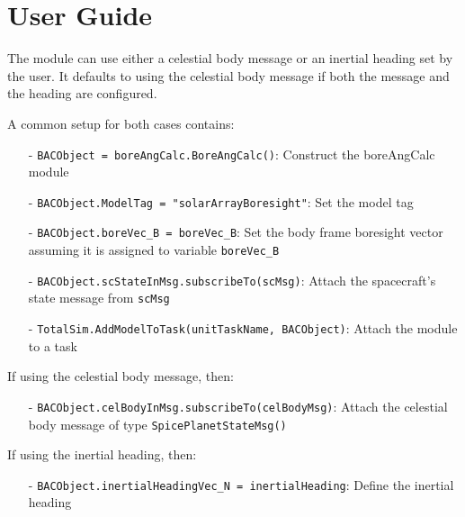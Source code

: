 \section{User Guide}

The module can use either a celestial body message or an inertial heading set by the user. It defaults to using the celestial body message if both the message and the heading are configured.

A common setup for both cases contains:

\begin{itemize}
  \item[-]      \texttt{BACObject = boreAngCalc.BoreAngCalc()}: Construct the boreAngCalc module
  \item[-]   \texttt{BACObject.ModelTag = "solarArrayBoresight"}: Set the model tag
  \item[-]   \texttt{BACObject.boreVec\_B = boreVec\_B}: Set the body frame boresight vector assuming it is assigned to variable \texttt{boreVec\_B}
  \item[-]   \texttt{BACObject.scStateInMsg.subscribeTo(scMsg)}: Attach the spacecraft's state message from \texttt{scMsg}
  \item[-]   \texttt{TotalSim.AddModelToTask(unitTaskName, BACObject)}: Attach the module to a task
\end{itemize}

If using the celestial body message, then:

\begin{itemize}
     \item[-]   \texttt{BACObject.celBodyInMsg.subscribeTo(celBodyMsg)}: Attach the celestial body message of type \texttt{SpicePlanetStateMsg()}
\end{itemize}

If using the inertial heading, then:

\begin{itemize}
     \item[-]   \texttt{BACObject.inertialHeadingVec\_N = inertialHeading}: Define the inertial heading
\end{itemize}
